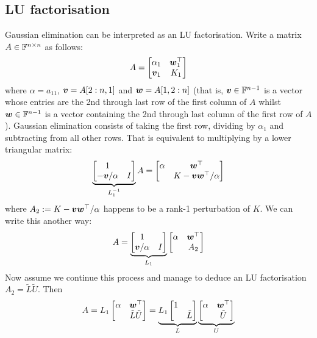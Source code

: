 \subsection{LU factorisation}
Gaussian elimination  can be interpreted as an LU factorisation. Write a matrix $A \in {\mathbb F}^{n \times n}$ as follows:
\[
A =  \begin{bmatrix} \alpha_1 & \bm{{\mbox{\boldmath$w$\unboldmath}}}_1^\top \\ \bm{{\mbox{\boldmath$v$\unboldmath}}}_1 & K_1 \end{bmatrix}
\]
where $\ensuremath{\alpha} = a_{11}$, $\bm{{\mbox{\boldmath$v$\unboldmath}}} = A[2:n, 1]$ and $\bm{{\mbox{\boldmath$w$\unboldmath}}} = A[1, 2:n]$ (that is, $\bm{{\mbox{\boldmath$v$\unboldmath}}} \in {\mathbb F}^{n-1}$ is a vector whose entries are the 2nd through last row of the first column of $A$ whilst $\bm{{\mbox{\boldmath$w$\unboldmath}}} \in {\mathbb F}^{n-1}$ is a vector containing the 2nd through last column of the first row of $A$). Gaussian elimination consists of taking the first row, dividing by $\ensuremath{\alpha}_1$ and subtracting from all other rows. That is equivalent to multiplying by a lower triangular matrix:
\[
\underbrace{\begin{bmatrix}
1 \\
-\bm{{\mbox{\boldmath$v$\unboldmath}}}/\alpha & I \end{bmatrix}}_{L_1^{-1}} A = \begin{bmatrix} \alpha & \bm{{\mbox{\boldmath$w$\unboldmath}}}^\top \\  & K -\bm{{\mbox{\boldmath$v$\unboldmath}}}\bm{{\mbox{\boldmath$w$\unboldmath}}}^\top /\alpha \end{bmatrix}
\]
where $A_2 := K -\bm{{\mbox{\boldmath$v$\unboldmath}}}\bm{{\mbox{\boldmath$w$\unboldmath}}}^\top /\alpha$  happens to be a rank-1 perturbation of $K$. We can write this another way:
\[
A = \underbrace{\begin{bmatrix}
1 \\
\bm{{\mbox{\boldmath$v$\unboldmath}}}/\alpha & I \end{bmatrix}}_{L_1}  \begin{bmatrix} \alpha & \bm{{\mbox{\boldmath$w$\unboldmath}}}^\top \\  & A_2 \end{bmatrix}
\]
Now assume we continue this process and manage to deduce an LU factorisation $A_2 = \tilde{L} \tilde{U}$. Then
\[
A = L_1 \begin{bmatrix} \alpha & \bm{{\mbox{\boldmath$w$\unboldmath}}}^\top \\  & \tilde{L} \tilde{U} \end{bmatrix}
= \underbrace{L_1 \begin{bmatrix}
1 \\
 & \tilde{L} \end{bmatrix}}_L  \underbrace{\begin{bmatrix} \alpha & \bm{{\mbox{\boldmath$w$\unboldmath}}}^\top \\  & \tilde{U} \end{bmatrix}}_U
\]
